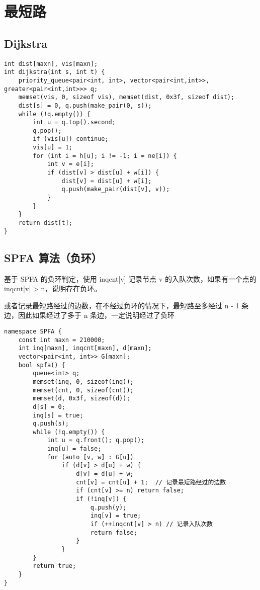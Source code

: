 \section{最短路}

\subsection{Dijkstra}
\begin{verbatim}
int dist[maxn], vis[maxn];
int dijkstra(int s, int t) {
    priority_queue<pair<int, int>, vector<pair<int,int>>, greater<pair<int,int>>> q;
    memset(vis, 0, sizeof vis), memset(dist, 0x3f, sizeof dist);
    dist[s] = 0, q.push(make_pair(0, s));
    while (!q.empty()) {
        int u = q.top().second;
        q.pop(); 
        if (vis[u]) continue;
        vis[u] = 1;
        for (int i = h[u]; i != -1; i = ne[i]) {
            int v = e[i];
            if (dist[v] > dist[u] + w[i]) {
                dist[v] = dist[u] + w[i];
                q.push(make_pair(dist[v], v));
            }
        }
    }
    return dist[t];
}
\end{verbatim}

\subsection{SPFA 算法（负环）}
\par \noindent 基于 SPFA 的负环判定，使用 inqcnt[v] 记录节点 v 的入队次数，如果有一个点的 inqcnt[v] > n，说明存在负环。
~\\
\par \noindent 或者记录最短路经过的边数，在不经过负环的情况下，最短路至多经过 n - 1 条边，因此如果经过了多于 n 条边，一定说明经过了负环
\begin{verbatim}
namespace SPFA {
    const int maxn = 210000;
    int inq[maxn], inqcnt[maxn], d[maxn];
    vector<pair<int, int>> G[maxn];
    bool spfa() {
        queue<int> q;
        memset(inq, 0, sizeof(inq));
        memset(cnt, 0, sizeof(cnt));
        memset(d, 0x3f, sizeof(d));
        d[s] = 0;
        inq[s] = true;
        q.push(s);
        while (!q.empty()) {
            int u = q.front(); q.pop();
            inq[u] = false;
            for (auto [v, w] : G[u]) 
                if (d[v] > d[u] + w) {
                    d[v] = d[u] + w;
                    cnt[v] = cnt[u] + 1;  // 记录最短路经过的边数
                    if (cnt[v] >= n) return false;
                    if (!inq[v]) {
                        q.push(y);
                        inq[v] = true;
                        if (++inqcnt[v] > n) // 记录入队次数
                        return false;
                    }
                }
        }
        return true;
    }
}
\end{verbatim}

